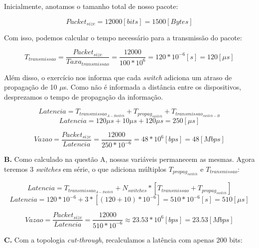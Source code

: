 \documentclass[12pt]{article}
\begin{document}
\begin{titlepage}
Inicialmente, anotamos o tamanho total de nosso pacote:

\begin{equation}
	Packet_{size} = 12000 [bits] = 1500 [Bytes]
\end{equation}

Com isso, podemos calcular o tempo necessário para a transmissão do pacote:

\begin{equation}
	T_{transmissao} = \frac{Packet_{size}}{Taxa_{transmissao}} = \frac{12000}{100 * 10^6} = 120*10^{-6} [s] = 120 [\mu s]	
\end{equation}	

Além disso, o exercício nos informa que cada \textit{switch} adiciona um atraso de propagação de 10 $\mu$s. Como não é informada a distância entre os dispositivos, desprezamos o tempo de propagação da informação.

\begin{equation}
	Latencia = T_{transmissao_{A-Switch}} + T_{propag_{switch}} + T_{transmissao_{switch-B}}
\end{equation} 
\begin{equation}
	Latencia = 120\mu s + 10\mu s + 120\mu s = 250 [\mu s]
\end{equation}

\begin{equation}
	Vazao = \frac{Packet_{size}}{Latencia} = \frac{12000}{250 * 10^{-6}} = 48 * 10^6 [bps] = 48 [Mbps]
\end{equation}

\textbf{B. } Como calculado na questão A, nossas variáveis permanecem as mesmas. Agora teremos 3 \textit{switches} em série, o que adiciona múltiplos $T_{propag_{switch}}$ e $T_{transmissao}$:

\begin{equation}
	Latencia = T_{transmissao_{A-Switch}} + N_{switches}*[T_{transmissao} + T_{propag_{switch}}]
\end{equation}
\begin{equation}
	Latencia = 120*10^{-6} + 3*[(120 + 10)*10^{-6}] = 510 * 10^{-6} [s] = 510 [\mu s] 
\end{equation}

\begin{equation}
	Vazao = \frac{Packet_{size}}{Latencia} = \frac{12000}{510 * 10^{-6}} \approx 23.53 * 10^6 [bps] = 23.53 [Mbps]
\end{equation}

\textbf{C. } Com a topologia \textit{cut-through}, recalculamos a latência com apenas 200 bits:


\end{titlepage}
\end{document}
